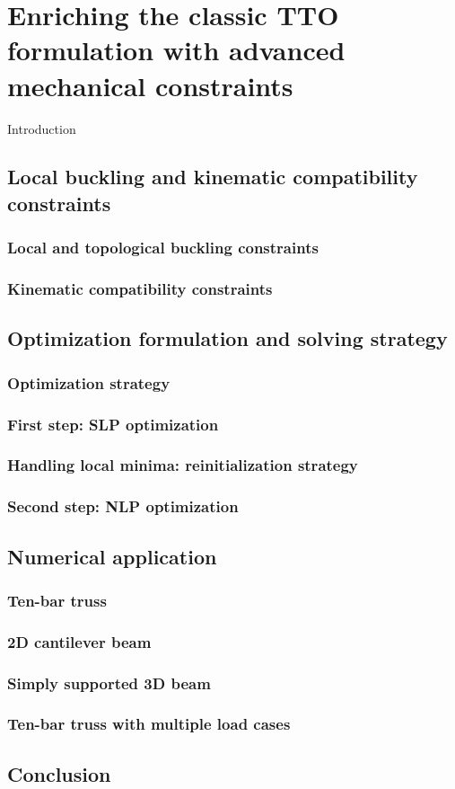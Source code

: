 \setchapterpreamble[u]{\margintoc}
\chapter{Enriching the classic TTO formulation with advanced mechanical constraints}
Introduction
\section{Local buckling and kinematic compatibility constraints}

\subsection{Local and topological buckling constraints}

\subsection{Kinematic compatibility constraints}

\section{Optimization formulation and solving strategy}

\subsection{Optimization strategy}

\subsection{First step: SLP optimization}

\subsection{Handling local minima: reinitialization strategy}

\subsection{Second step: NLP optimization}

\section{Numerical application}

\subsection{Ten-bar truss}

\subsection{2D cantilever beam}

\subsection{Simply supported 3D beam}

\subsection{Ten-bar truss with multiple load cases}

\section{Conclusion}